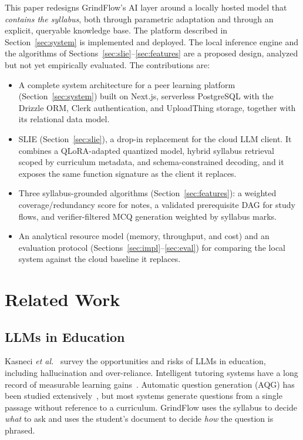 \documentclass[conference]{IEEEtran}
\begin{document}
This paper redesigns GrindFlow's AI layer around a locally hosted model that
\emph{contains the syllabus}, both through parametric adaptation and through
an explicit, queryable knowledge base. The platform described in
Section~\ref{sec:system} is implemented and deployed. The local inference
engine and the algorithms of Sections~\ref{sec:slie}--\ref{sec:features}
are a proposed design, analyzed but not yet empirically evaluated. The
contributions are:

\begin{itemize}
\item A complete system architecture for a peer learning platform
(Section~\ref{sec:system}) built on Next.js, serverless PostgreSQL with the
Drizzle ORM, Clerk authentication, and UploadThing storage, together with its
relational data model.
\item SLIE (Section~\ref{sec:slie}), a drop-in replacement for the cloud LLM
client. It combines a QLoRA-adapted quantized model, hybrid syllabus
retrieval scoped by curriculum metadata, and schema-constrained decoding, and
it exposes the same function signature as the client it replaces.
\item Three syllabus-grounded algorithms (Section~\ref{sec:features}): a
weighted coverage/redundancy score for notes, a validated prerequisite DAG
for study flows, and verifier-filtered MCQ generation weighted by syllabus
marks.
\item An analytical resource model (memory, throughput, and cost) and an
evaluation protocol
(Sections~\ref{sec:impl}--\ref{sec:eval}) for comparing the local system
against the cloud baseline it replaces.
\end{itemize}

\section{Related Work}

\subsection{LLMs in Education}
Kasneci \textit{et al.}~\cite{kasneci2023chatgpt} survey the opportunities
and risks of LLMs in education, including hallucination and over-reliance.
Intelligent tutoring systems have a long record of measurable learning
gains~\cite{kulik2016effectiveness}. Automatic question generation (AQG) has
been studied extensively~\cite{kurdi2020systematic}, but most systems
generate questions from a single passage without reference to a curriculum.
GrindFlow uses the syllabus to decide \emph{what} to ask and uses the
student's document to decide \emph{how} the question is phrased.
\end{document}
